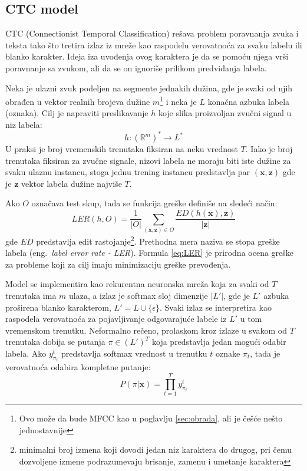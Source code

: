 \documentclass[a4paper]{article}
\begin{document}
\subsection{CTC model}
\label{sec:ctc}

CTC (Connectionist Temporal Classification) rešava problem poravnanja zvuka i teksta tako što tretira izlaz iz mreže kao raspodelu verovatnoća za svaku labelu ili blanko karakter.
Ideja iza uvođenja ovog karaktera je da se pomoću njega vrši poravnanje sa zvukom, ali da se on ignoriše prilikom predviđanja labela.

Neka je ulazni zvuk podeljen na segmente jednakih dužina, gde je svaki od njih obrađen u vektor realnih brojeva dužine $m$\footnote{Ovo može da bude MFCC kao u poglavlju \ref{sec:obrada}, ali je češće nešto jednostavnije} i neka je $L$ konačna azbuka labela (oznaka).
Cilj je napraviti preslikavanje $h$ koje slika proizvoljan zvučni signal u niz labela:
\begin{equation}
\label{eq:pres1}
h: (\mathbb{R}^m)^* \rightarrow L^* 
\end{equation}
U praksi je broj vremenskih trenutaka fiksiran na neku vrednost $T$.
Iako je broj trenutaka fiksiran za zvučne signale, nizovi labela ne moraju biti iste dužine za svaku ulaznu instancu, stoga jednu trening instancu predstavlja par $(\textbf{x}, \textbf{z})$ gde je $\textbf{z}$ vektor labela dužine najviše $T$.

Ako $O$ označava test skup, tada se funkcija greške definiše na sledeći način:
\begin{equation}
\label{eq:LER}
LER(h, O) = \frac{1}{|O|}\sum_{(\textbf{x}, \textbf{z}) \in O}\frac{ED(h(\textbf{x}), \textbf{z})}{\textbf{|z|}}
\end{equation}
gde $ED$ predstavlja edit rastojanje\footnote{minimalni broj izmena koji dovodi jedan niz karaktera do drugog, pri čemu dozvoljene izmene podrazumevaju brisanje, zamenu i umetanje karaktera}. Prethodna mera naziva se stopa greške labela (eng.~{\em label error rate - LER}).
Formula \ref{eq:LER} je prirodna ocena greške za probleme koji za cilj imaju minimizaciju greške prevođenja.

Model se implementira kao rekurentna neuronska mreža koja za svaki od $T$ trenutaka ima $m$ ulaza, a izlaz je softmax sloj dimenzije $|L'|$, gde je $L'$ azbuka proširena blanko karakterom, $L' = L \cup \{\epsilon\}$.
Svaki izlaz se interpretira kao raspodela verovatnoća za pojavljivanje odgovarajuće labele iz $L'$ u tom vremenskom trenutku.
Neformalno rečeno, prolaskom kroz izlaze u svakom od $T$ trenutaka dobija se putanja $\pi \in (L')^T$ koja predstavlja jedan mogući odabir labela.
Ako $y_{\pi_t}^t$ predstavlja softmax vrednost u trenutku $t$ oznake $\pi_t$, tada je verovatnoća odabira kompletne putanje:
\begin{equation*}
  P(\pi|\textbf{x}) = \prod_{t=1}^Ty_{\pi_t}^t
\end{equation*}
\end{document}
